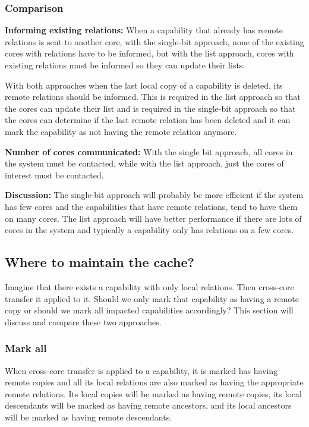 \documentclass[a4paper,twoside]{report} %
\begin{document}
\subsubsection{Comparison}
\textbf{Informing existing relations:} When a capability that already
has remote relations is sent to another core, with the single-bit
approach, none of the existing cores with relations have to be
informed, but with the list approach, cores with existing relations
must be informed so they can update their lists.

With both approaches when the last local copy of a capability is
deleted, its remote relations should be informed. This is required in
the list approach so that the cores can update their list and is
required in the single-bit approach so that the cores can determine if
the last remote relation has been deleted and it can mark the
capability as not having the remote relation anymore.

\textbf{Number of cores communicated:} With the single bit approach,
all cores in the system must be contacted, while with the list
approach, just the cores of interest must be contacted.

\textbf{Discussion:} The single-bit approach will probably be more
efficient if the system has few cores and the capabilities that have
remote relations, tend to have them on many cores. The list approach
will have better performance if there are lots of cores in the system
and typically a capability only has relations on a few cores.

\subsection{Where to maintain the cache?}\label{subsec:where}
Imagine that there exists a capability with only local relations. Then
cross-core transfer it applied to it. Should we only mark that
capability as having a remote copy or should we mark all impacted
capabilities accordingly? This section will discuss and compare these
two approaches.

\subsubsection{Mark all}
When cross-core transfer is applied to a capability, it is marked has
having remote copies and all its local relations are also marked as
having the appropriate remote relations. Its local copies will be
marked as having remote copies, its local descendants will be marked
as having remote ancestors, and its local ancestors will be marked as
having remote descendants.
\end{document}
